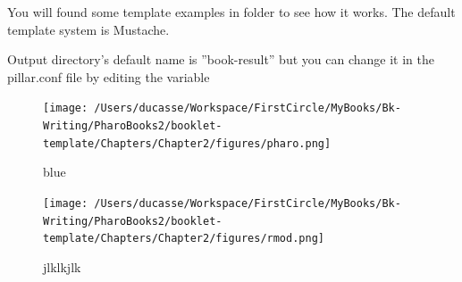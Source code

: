 \documentclass[10pt,twoside,english]{_support/latex/sbabook/sbabook}
\begin{document}
You will found some template examples in  folder to see how it works.
The default template system is Mustache.

Output directory's default name is ''book-result'' but you can change it in the pillar.conf file by editing the variable

\begin{figure}[htpb]
\begin{center}
\texttt{[image: /Users/ducasse/Workspace/FirstCircle/MyBooks/Bk-Writing/PharoBooks2/booklet-template/Chapters/Chapter2/figures/pharo.png]}
\caption{blue}
\end{center}
\end{figure}
\begin{figure}[htpb]
\begin{center}
\texttt{[image: /Users/ducasse/Workspace/FirstCircle/MyBooks/Bk-Writing/PharoBooks2/booklet-template/Chapters/Chapter2/figures/rmod.png]}
\caption{jlklkjlk}
\end{center}
\end{figure}



\backmatter

\end{document}
